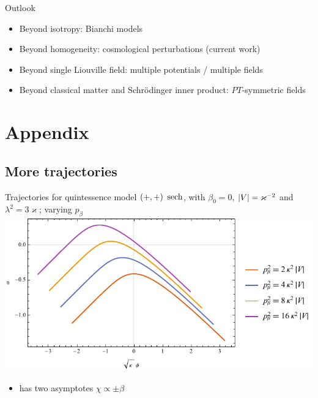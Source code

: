 \documentclass[8pt]{beamer}
\begin{document}
\begin{frame}%
{Outlook}%
\begin{itemize}
\item Beyond isotropy: Bianchi models

\item Beyond homogeneity: cosmological perturbations 
 (current work)

\item Beyond single Liouville field: multiple potentials / multiple 
fields

\item Beyond classical matter and Schrödinger inner product: $PT$-symmetric 
fields

\end{itemize}
\end{frame}


\section*{Appendix}

\subsection*{More trajectories}

\begin{frame}%
{Trajectories for quintessence model ${\left(+,+\right)}$}%
{$\operatorname{sech}$, with $\beta_0 = 0$, ${\left|V\right|} = \varkappa^{-2}$ and
$\lambda^2 = 3\varkappa$; varying $p_\beta$}
\includegraphics[width=\textwidth]{../plots.nb/sech_pbet.pdf}
\begin{itemize}
	\item has two asymptotes $\chi \propto \pm \beta$
\end{itemize}
\end{frame}
\end{document}
